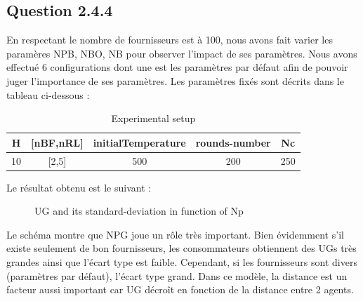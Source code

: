 \subsection{Question 2.4.4}
En respectant le nombre de fournisseurs est à 100, nous avons fait varier les paramères NPB, NBO, NB pour observer l'impact de ses paramètres. Nous avons effectué 6 configurations dont une est les paramètres par défaut afin de pouvoir juger l'importance de ses paramètres. Les paramètres fixés sont décrits dans le tableau ci-dessous :
\begin{table}[H]
    \centering
    \begin{tabular}{|c|c|c|c|c|}
    \hline
         H & [nBF,nRL] & initialTemperature & rounds-number & Nc\\ \hline
         10 &[2,5] & 500 & 200 &250\\\hline
    \end{tabular}
    \caption{Experimental setup}
    \label{tab:Experimental setup3}
\end{table}
Le résultat obtenu est le suivant :
\begin{figure}[H]
    \centering
    \qquad
    \caption{UG and its standard-deviation in function of Np}%
    \label{fig:UGNp}%
\end{figure}

Le schéma montre que NPG joue un rôle très important. Bien évidemment s'il existe seulement de bon fournisseurs, les consommateurs obtiennent des UGs très grandes ainsi que l'écart type est faible. Cependant, si les fournisseurs sont divers (paramètres par défaut), l'écart type grand. Dans ce modèle, la distance est un facteur aussi important car UG décroît en fonction de la distance entre 2 agents.
